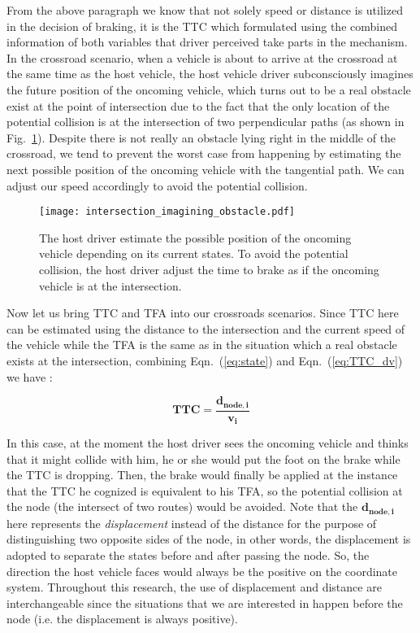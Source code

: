 From the above paragraph we know that not solely speed or distance is utilized in the decision of braking, it is the TTC which formulated using the combined information of both variables that driver perceived take parts in the mechanism. In the crossroad scenario, when a vehicle is about to arrive at the crossroad at the same time as the host vehicle, the host vehicle driver subconsciously imagines the future position of the oncoming vehicle, which turns out to be a real obstacle exist at the point of intersection due to the fact that the only location of the potential collision is at the intersection of two perpendicular paths (as shown in Fig.~\ref{fig:imagine_obstacle}). Despite there is not really an obstacle lying right in the middle of the crossroad, we tend to prevent the worst case from happening by estimating the next possible position of the oncoming vehicle with the tangential path. We can adjust our speed accordingly to avoid the potential collision.  

\begin{figure}[htbp!]
\begin{center}
\texttt{[image: intersection\_imagining\_obstacle.pdf]}
\end{center}
\caption{The host driver estimate the possible position of the oncoming vehicle depending on its current states. To avoid the potential collision, the host driver adjust the time to brake as if the oncoming vehicle is at the intersection.}
\label{fig:imagine_obstacle} 
\end{figure}

Now let us bring TTC and TFA into our crossroads scenarios. Since TTC here can be estimated using the distance to the intersection and the current speed of the vehicle while the TFA is the same as in the situation which a real obstacle exists at the intersection, combining Eqn.~(\ref{eq:state}) and Eqn.~(\ref{eq:TTC_dv}) we have : 

\begin{equation}
\mathbf{TTC} = \frac{\mathbf{d_{node,i}}}{\mathbf{v_{i}}}
\label{eq:TTC_crossroad}
\end{equation}

In this case, at the moment the host driver sees the oncoming vehicle and thinks that it might collide with him, he or she would put the foot on the brake while the TTC is dropping. Then, the brake would finally be applied at the instance that the TTC he cognized is equivalent to his TFA, so the potential collision at the node (the intersect of two routes) would be avoided. Note that the $\mathbf{d_{node,i}}$ here represents the \textit{displacement} instead of the distance for the purpose of distinguishing two opposite sides of the node, in other words, the displacement is adopted to separate the states before and after passing the node. So, the direction the host vehicle faces would always be the positive on the coordinate system. Throughout this research, the use of displacement and distance are interchangeable since the situations that we are interested in happen before the node (i.e. the displacement is always positive).



